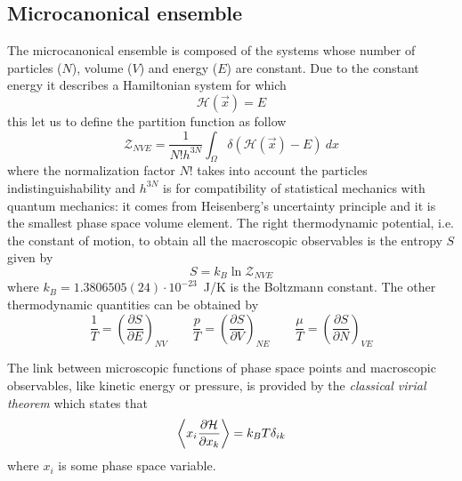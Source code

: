 \subsection{Microcanonical ensemble}
The microcanonical ensemble is composed of the systems whose number of particles ($N$), volume ($V$) and energy 
($E$) are constant. Due to the constant energy it describes a Hamiltonian system for which
\begin{equation*}
	\mathcal{H}(\vec x) = E
\end{equation*}
this let us to define the partition function as follow
\begin{equation}
	\mathcal{Z}_{NVE} = \frac{1}{N!h^{3N}}\int_\Omega \delta(\mathcal{H}(\vec x) - E)\ dx
	\label{eq:micropartition}
\end{equation}
where the normalization factor $N!$ takes into account the particles indistinguishability and $h^{3N}$ is for 
compatibility of statistical mechanics with quantum mechanics: it comes from Heisenberg’s uncertainty principle 
and it is the smallest phase space volume element. The right thermodynamic potential, i.e. the constant of 
motion, to obtain all the macroscopic observables is the entropy $S$ given by
\begin{equation*}
	S = k_B \ln \mathcal{Z}_{NVE}
\end{equation*}
where $k_B = 1.3806505(24) \cdot 10^{-23}$~J/K is the Boltzmann constant. The other thermodynamic quantities can 
be obtained by
\begin{equation*}
	\frac{1}{T} = \left ( \frac{\partial S}{\partial E}\right )_{NV} \qquad \frac{p}{T} = \left ( \frac{\partial S}{\partial V}\right )_{NE} \qquad \frac{\mu}{T} = \left ( \frac{\partial S}{\partial N}\right )_{VE}
\end{equation*}

The link between microscopic functions of phase space points and macroscopic observables, like kinetic energy or 
pressure, is provided by the \textit{classical virial theorem} which states that
\begin{equation}
	\left \langle x_i\frac{\partial\mathcal{H}}{\partial x_k} \right \rangle = k_B T \delta_{ik}
	\label{eq:virial}
\end{equation}
where $x_i$ is some phase space variable.

